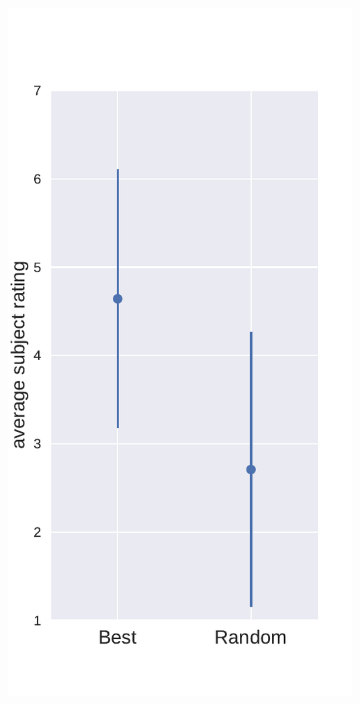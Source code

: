 \begin{figure}
	\centering
	\begin{subfigure}[b]{0.33\textwidth}
		\includegraphics[width=\textwidth, valign=t]{figures/best_vs_random}
		\caption{}
		\label{fig:best_vs_random}

\end{subfigure}
\end{figure}
